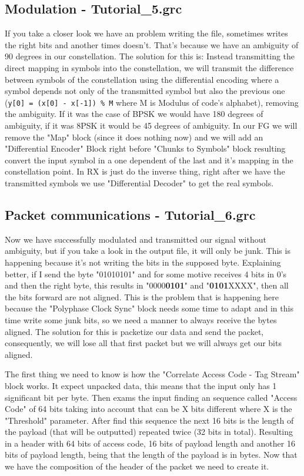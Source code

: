 \documentclass[a4paper, 10pt, conference]{ieeeconf}      %
\begin{document}
\subsection{Modulation - Tutorial\_5.grc}
    If you take a closer look we have an problem writing the file, sometimes writes the right bits and another times doesn't. That's because we have an ambiguity of 90 degrees in our constellation. The solution for this is: Instead transmitting the direct mapping in symbols into the constellation, we will transmit the difference between symbols of the constellation using the differential encoding where a symbol depends not only of the transmitted symbol but also the previous one (\verb|y[0] = (x[0] - x[-1]) % M| where M is Modulus of code's alphabet), removing the ambiguity. If it was the case of BPSK we would have 180 degrees of ambiguity, if it was 8PSK it would be 45 degrees of ambiguity.
    In our FG we will remove the "Map" block (since it does nothing now) and we will add an "Differential Encoder" Block right before "Chunks to Symbols" block resulting convert the input symbol in a one dependent of the last and it's mapping in the constellation point. 
    In RX is just do the inverse thing, right after we have the transmitted symbols we use "Differential Decoder" to get the real symbols.
    
    
\subsection{Packet communications - Tutorial\_6.grc}
    Now we have successfully modulated and transmitted our signal without ambiguity, but if you take a look in the output file, it will only be junk. This is happening because it's not writing the bits in the supposed byte. Explaining better, if I send the byte "01010101" and for some motive receives 4 bits in 0's and then the right byte, this results in "0000\textbf{0101}" and "\textbf{0101}XXXX", then all the bits forward are not aligned. This is the problem that is happening here because the "Polyphase Clock Sync" block needs some time to adapt and in this time write some junk bits, so we need a manner to always receive the bytes aligned. The solution for this is packetize our data and send the packet, consequently, we will lose all that first packet but we will always get our bits aligned.
    
    The first thing we need to know is how the "Correlate Access Code - Tag Stream" block works. It expect unpacked data, this means that the input only has 1 significant bit per byte. Then exams the input finding an sequence called "Access Code" of 64 bits taking into account that can be X bits different where X is the "Threshold" parameter. After find this sequence the next 16 bits is the length of the payload (that will be outputted) repeated twice (32 bits in total). Resulting in a header with 64 bits of access code, 16 bits of payload length and another 16 bits of payload length, being that the length of the payload is in bytes. Now that we have the composition of the header of the packet we need to create it.
    
\end{document}
